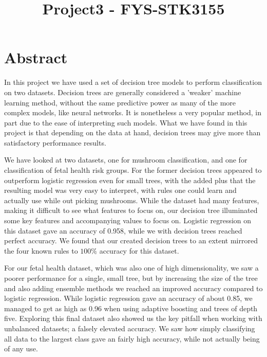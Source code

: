 \documentclass[11pt]{article}
\title{Project3 - FYS-STK3155}
\begin{document}
    
    \maketitle
    
    

    
    \hypertarget{abstract}{%
\section{Abstract}\label{abstract}}

    In this project we have used a set of decision tree models to perform classification on two datasets. Decision trees are generally considered a 'weaker' machine learning method, without the same predictive power as many of the more complex models, like neural networks. It is nonetheless a very popular method, in part due to the ease of interpreting such models. What we have found in this project is that depending on the data at hand, decision trees may give more than satisfactory performance results. 
    
    We have looked at two datasets, one for mushroom classification, and one for classification of fetal health risk groups. For the former decision trees appeared to outperform logistic regression even for small trees, with the added plus that the resulting model was very easy to interpret, with rules one could learn and actually use while out picking mushrooms. While the dataset had many features, making it difficult to see what features to focus on, our decision tree illuminated some key features and accompanying values to focus on. Logistic regression on this dataset gave an accuracy of 0.958, while we with decision trees reached perfect accuracy. We found that our created decision trees to an extent mirrored the four known rules to $100 \%$ accuracy for this dataset. 
    
    For our fetal health dataset, which was also one of high dimensionality, we saw a poorer performance for a single, small tree, but by increasing the size of the tree and also adding ensemble methods we reached an improved accuracy compared to logistic regression. While logistic regression gave an accuracy of about 0.85, we managed to get as high as 0.96 when using adaptive boosting and trees of depth five. Exploring this final dataset also showed us the key pitfall when working with unbalanced datasets; a falsely elevated accuracy. We saw how simply classifying all data to the largest class gave an fairly high accuracy, while not actually being of any use. 
\end{document}
